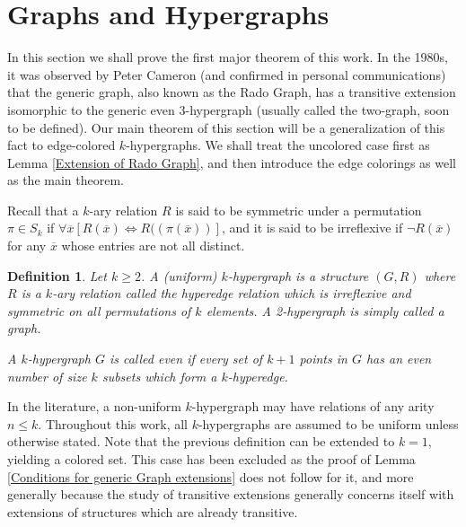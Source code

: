 \documentclass{amsart}
\newtheorem{definition}[theorem]{Definition}
\begin{document}
\section{Graphs and Hypergraphs}

In this section we shall prove the first major theorem of this work. In the 1980s, it was observed by Peter Cameron (and confirmed in personal communications) that the generic graph, also known as the Rado Graph, has a transitive extension isomorphic to the generic even 3-hypergraph (usually called the two-graph, soon to be defined). Our main theorem of this section will be a generalization of this fact to edge-colored $k$-hypergraphs. We shall treat the uncolored case first as Lemma \ref{Extension of Rado Graph}, and then introduce the edge colorings as well as the main theorem. 

Recall that a $k$-ary relation $R$ is said to be symmetric under a permutation $\pi \in S_k$ if $\forall \overline{x}[R(\overline{x}) \Leftrightarrow R((\pi(\overline{x}))]$, and it is said to be irreflexive if $\lnot R(\overline{x})$ for any $\overline{x}$ whose entries are not all distinct.


\begin{definition}
    Let $k \geq 2$. A (uniform) $k$-hypergraph is a structure $(G, R)$ where $R$ is a $k$-ary relation called the hyperedge relation which is irreflexive and symmetric on all permutations of $k$ elements. A 2-hypergraph is simply called a graph.

    A $k$-hypergraph $G$ is called \emph{even} if every set of $k+1$ points in $G$ has an even number of size $k$ subsets which form a $k$-hyperedge.
\end{definition}

In the literature, a non-uniform $k$-hypergraph may have relations of any arity $n \leq k$. Throughout this work, all $k$-hypergraphs are assumed to be uniform unless otherwise stated. Note that the previous definition can be extended to $k=1$, yielding a colored set. This case has been excluded as the proof of Lemma \ref{Conditions for generic Graph extensions} does not follow for it, and more generally because the study of transitive extensions generally concerns itself with extensions of structures which are already transitive.
\end{document}
